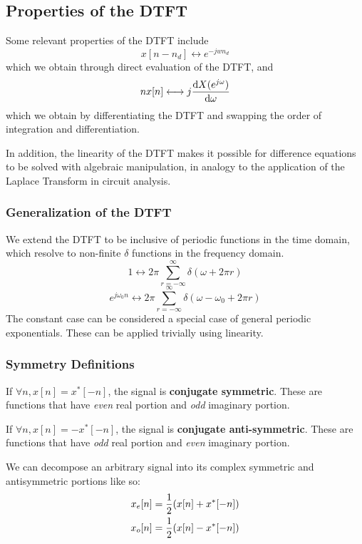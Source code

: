 \documentclass{article}
\newcommand{\jw}{{j\omega}}
\newcommand{\w}{\omega}
\begin{document}
\subsection{Properties of the DTFT}
Some relevant properties of the DTFT include
\[
    x[n-n_d] \longleftrightarrow e^{-jw n_d}
\]
which we obtain through direct evaluation of the DTFT, and
\[
nx[n] \longleftrightarrow j\dv{X(e^\jw)}{\w}
\]
which we obtain by differentiating the DTFT and swapping the order of integration and differentiation.

In addition, the linearity of the DTFT makes it possible for difference equations to be solved with algebraic manipulation, in analogy to the application of the Laplace Transform in circuit analysis.

\subsubsection{Generalization of the DTFT}
We extend the DTFT to be inclusive of periodic functions in the time domain, which resolve to non-finite $\delta$ functions in the frequency domain.
\[
    1 \longleftrightarrow 2\pi\sum_{r=-\infty}^\infty\delta(\omega + 2\pi r)
\]
\[
    e^{j\w_0n} \longleftrightarrow 2\pi\sum_{r=-\infty}^\infty\delta(\omega - \w_0 + 2\pi r)
\]
The constant case can be considered a special case of general periodic exponentials. These can be applied trivially using linearity.

\subsubsection{Symmetry Definitions}
If $\forall n, x[n] = x^*[-n]$, the signal is \textbf{conjugate symmetric}. These are functions that have \textit{even} real portion and \textit{odd} imaginary portion.

If $\forall n, x[n]= -x^*[-n]$, the signal is \textbf{conjugate anti-symmetric}. These are functions that have \textit{odd} real portion and \textit{even} imaginary portion.

We can decompose an arbitrary signal into its complex symmetric and antisymmetric portions like so:
\begin{align*}
	x_e[n] = \frac{1}{2}\qty(x[n]+x^*[-n])\\
	x_o[n] = \frac{1}{2}\qty(x[n]-x^*[-n])
\end{align*}
\end{document}
